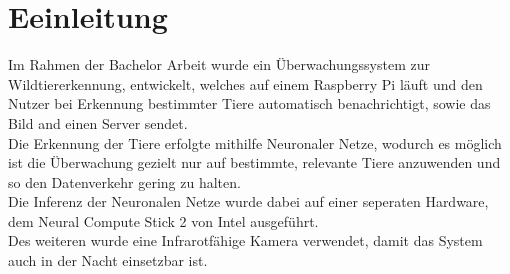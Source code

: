\chapter{Eeinleitung}\label{kap:einleitung2}

Im Rahmen der Bachelor Arbeit wurde ein Überwachungssystem zur Wildtiererkennung,
entwickelt, welches auf einem Raspberry Pi läuft und den Nutzer bei Erkennung
bestimmter Tiere automatisch benachrichtigt, sowie das Bild and einen Server sendet.
\\
Die Erkennung der Tiere erfolgte mithilfe Neuronaler Netze, wodurch es möglich ist 
die Überwachung gezielt nur auf bestimmte, relevante Tiere anzuwenden und so den
Datenverkehr gering zu halten. 
\\
Die Inferenz der Neuronalen Netze wurde dabei auf einer seperaten Hardware, dem 
Neural Compute Stick 2 von Intel ausgeführt.
\\
Des weiteren wurde eine Infrarotfähige Kamera verwendet, damit das System auch
in der Nacht einsetzbar ist.

